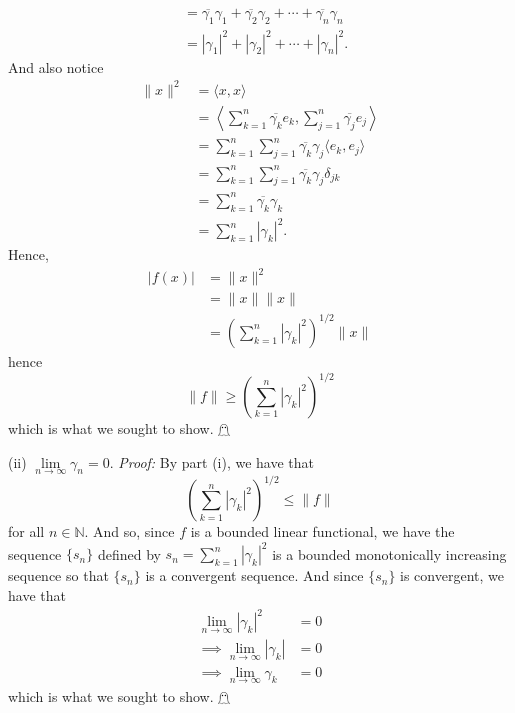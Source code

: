 \documentclass{article}
\begin{document}
\begin{itemize}
\begin{align*}
        &= \overline{\gamma_1}\gamma_1 + \overline{\gamma_2}\gamma_2 + \cdots + \overline{\gamma_n}\gamma_n\\
        &= |\gamma_1|^2 + |\gamma_2|^2 + \cdots + |\gamma_n|^2.
    \end{align*}
    And also notice
    \begin{align*}
        \|x\|^2 &= \langle x, x\rangle\\
        &= \left\langle \sum_{k = 1}^n \overline{\gamma_k}e_k, \sum_{j = 1}^n \overline{\gamma_j}e_j \right\rangle\\
        &= \sum_{k = 1}^n\sum_{j = 1}^n \overline{\gamma_k}\gamma_j \langle e_k, e_j \rangle\\
        &= \sum_{k = 1}^n\sum_{j = 1}^n \overline{\gamma_k}\gamma_j \delta_{jk}\\
        &= \sum_{k = 1}^n \overline{\gamma_k}\gamma_k\\
        &= \sum_{k = 1}^n |\gamma_k|^2.
    \end{align*}
    Hence, 
    \begin{align*}
        |f(x)| &= \|x\|^2\\
        &= \|x\|\|x\|\\
        &= \left(\sum_{k = 1}^n |\gamma_k|^2\right)^{1/2}\|x\|
    \end{align*}
    hence
    \[\|f\| \geq \left(\sum_{k = 1}^n|\gamma_k|^2\right)^{1/2}\]
    which is what we sought to show. \hfill $\mathghost$
    \newline\newline
    
    (ii) $\underset{n \to \infty}{\lim} \gamma_n = 0$.
    \newline
    \textit{Proof:} By part (i), we have that
    \[\left(\sum_{k = 1}^n|\gamma_k|^2\right)^{1/2} \leq \|f\|\]
    for all $n \in \mathbb{N}$. And so, since $f$ is a bounded linear functional, we have the sequence $\{s_n\}$ defined by $s_n = \sum_{k = 1}^n|\gamma_k|^2$ is a bounded monotonically increasing sequence so that $\{s_n\}$ is a convergent sequence. And since $\{s_n\}$ is convergent, we have that 
    \begin{align*}
        \lim_{n \to \infty} |\gamma_k|^2 &= 0\\
        \implies \lim_{n \to \infty} |\gamma_k| &= 0\\
        \implies \lim_{n \to \infty} \gamma_k &= 0
    \end{align*}
    which is what we sought to show. \hfill $\mathghost$
    \newline\newline
    

\end{itemize}
\end{document}
